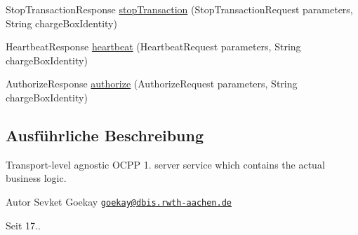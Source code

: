 \begin{DoxyCompactItemize}
\item 
Stop\-Transaction\-Response \hyperlink{classde_1_1rwth_1_1idsg_1_1steve_1_1service_1_1_central_system_service12___service_ab0f9573b5b8cf848db098e2c54e10dd9}{stop\-Transaction} (Stop\-Transaction\-Request parameters, String charge\-Box\-Identity)
\item 
Heartbeat\-Response \hyperlink{classde_1_1rwth_1_1idsg_1_1steve_1_1service_1_1_central_system_service12___service_a53dea29e3048cc71a29b71728fdb7d0e}{heartbeat} (Heartbeat\-Request parameters, String charge\-Box\-Identity)
\item 
Authorize\-Response \hyperlink{classde_1_1rwth_1_1idsg_1_1steve_1_1service_1_1_central_system_service12___service_aa37ed4b7180b56067a61bb5c30bdbc6a}{authorize} (Authorize\-Request parameters, String charge\-Box\-Identity)
\end{DoxyCompactItemize}


\subsection{Ausführliche Beschreibung}
Transport-\/level agnostic O\-C\-P\-P 1. server service which contains the actual business logic.

\begin{DoxyAuthor}{Autor}
Sevket Goekay \href{mailto:goekay@dbis.rwth-aachen.de}{\tt goekay@dbis.\-rwth-\/aachen.\-de} 
\end{DoxyAuthor}
\begin{DoxySince}{Seit}
17.. 
\end{DoxySince}


